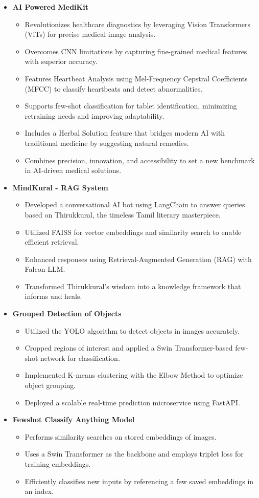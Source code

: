 \documentclass[letterpaper,11pt]{article}
\newcommand{\resitem}[1]{\item #1 \vspace{-2pt}}
\begin{document}
\begin{itemize}

\item[]
	\textbf{AI Powered MediKit}
	\vspace{-3mm}
	\begin{itemize}
		\resitem{Revolutionizes healthcare diagnostics by leveraging Vision Transformers (ViTs) for precise medical image analysis.}
		\resitem{Overcomes CNN limitations by capturing fine-grained medical features with superior accuracy.}
		\resitem{Features Heartbeat Analysis using Mel-Frequency Cepstral Coefficients (MFCC) to classify heartbeats and detect abnormalities.}
		\resitem{Supports few-shot classification for tablet identification, minimizing retraining needs and improving adaptability.}
		\resitem{Includes a Herbal Solution feature that bridges modern AI with traditional medicine by suggesting natural remedies.}
		\resitem{Combines precision, innovation, and accessibility to set a new benchmark in AI-driven medical solutions.}
	\end{itemize}

\item[]
	\textbf{MindKural - RAG System}
	\vspace{-3mm}
	\begin{itemize}
		\resitem{Developed a conversational AI bot using LangChain to answer queries based on Thirukkural, the timeless Tamil literary masterpiece.}
		\resitem{Utilized FAISS for vector embeddings and similarity search to enable efficient retrieval.}
		\resitem{Enhanced responses using Retrieval-Augmented Generation (RAG) with Falcon LLM.}
		\resitem{Transformed Thirukkural’s wisdom into a knowledge framework that informs and heals.}
	\end{itemize}

\item[]
	\textbf{Grouped Detection of Objects}
	\vspace{-3mm}
	\begin{itemize}
		\resitem{Utilized the YOLO algorithm to detect objects in images accurately.}
		\resitem{Cropped regions of interest and applied a Swin Transformer-based few-shot network for classification.}
		\resitem{Implemented K-means clustering with the Elbow Method to optimize object grouping.}
		\resitem{Deployed a scalable real-time prediction microservice using FastAPI.}
	\end{itemize}

\item[]
	\textbf{Fewshot Classify Anything Model}
	\vspace{-3mm}
	\begin{itemize}
	    \resitem{Performs similarity searches on stored embeddings of images.}
	    \resitem{Uses a Swin Transformer as the backbone and employs triplet loss for training embeddings.}
	    \resitem{Efficiently classifies new inputs by referencing a few saved embeddings in an index.}
	\end{itemize}


\end{itemize}
\end{document}
